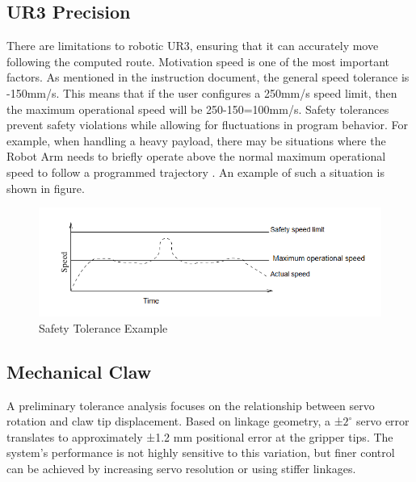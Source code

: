 \documentclass{senior-design}
\begin{document}
\subsection{UR3 Precision}
There are limitations to robotic UR3, ensuring that it can accurately move 
following the computed route. Motivation speed is one of the most important 
factors. As mentioned in the instruction document, the general speed tolerance 
is -150mm/s. This means that if the user conﬁgures a 250mm/s speed limit, then 
the maximum operational speed will be 250-150=100mm/s. Safety tolerances 
prevent safety violations while allowing for ﬂuctuations in program behavior. 
For example, when handling a heavy payload, there may be situations where the 
Robot Arm needs to brieﬂy operate above the normal maximum operational speed to 
follow a programmed trajectory \cite{ur3-manual}. An example of such a situation is shown in 
ﬁgure. 
\begin{figure}[H]
    \centering
    \includegraphics[width=0.8\linewidth]{UR3 Tolerance.png}
    \caption{Safety Tolerance Example}
\end{figure}
\subsection{Mechanical Claw}
A preliminary tolerance analysis focuses on the relationship between servo 
rotation and claw tip displacement. Based on linkage geometry, a ±$2^{\circ}$ servo 
error translates to approximately ±1.2 mm positional error at the gripper tips. 
The system’s performance is not highly sensitive to this variation, but finer 
control can be achieved by increasing servo resolution or using stiffer 
linkages. 
\end{document}
